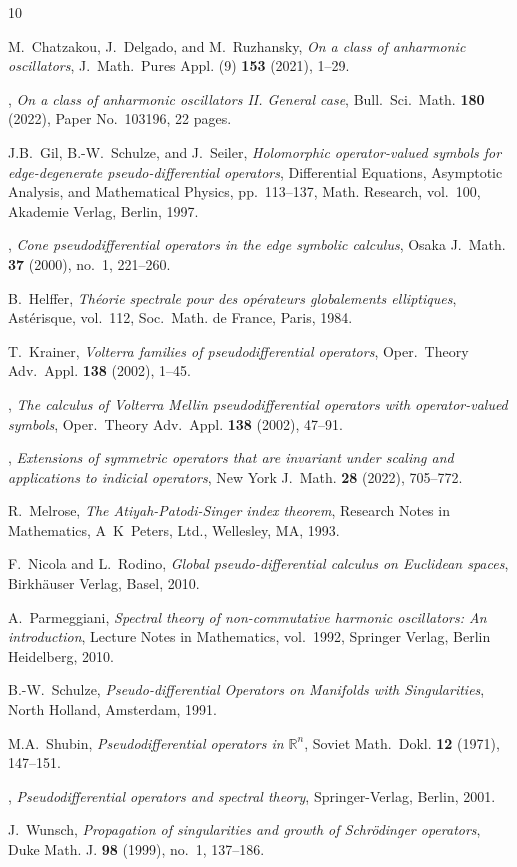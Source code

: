 \documentclass[reqno]{amsart}
\numberwithin{equation}{section}
\theoremstyle{definition}
\begin{document}
\begin{thebibliography}{10}

M.~Chatzakou, J.~Delgado, and M.~Ruzhansky, \emph{On a class of anharmonic oscillators}, J.~Math.~Pures Appl. (9) \textbf{153} (2021), 1--29.

\bysame, \emph{On a class of anharmonic oscillators II. General case}, Bull.~Sci.~Math. \textbf{180} (2022), Paper No.~103196, 22 pages.

J.B.~Gil, B.-W.~Schulze, and J.~Seiler, \emph{Holomorphic operator-valued symbols for edge-degenerate pseudo-differential operators}, Differential Equations, Asymptotic Analysis, and Mathematical Physics, pp.~113--137, Math. Research, vol.~100, Akademie Verlag, Berlin, 1997.

\bysame, \emph{Cone pseudodifferential operators in the edge symbolic calculus}, Osaka J.~Math. \textbf{37} (2000), no.~1, 221--260.

B.~Helffer, \emph{Th{\'e}orie spectrale pour des op{\'e}rateurs globalements elliptiques}, Ast{\'e}risque, vol.~112, Soc.~Math. de France, Paris, 1984.

T.~Krainer, \emph{Volterra families of pseudodifferential operators}, Oper.~Theory Adv.~Appl. \textbf{138} (2002), 1--45.

\bysame, \emph{The calculus of Volterra Mellin pseudodifferential operators with operator-valued symbols}, Oper.~Theory Adv.~Appl. \textbf{138} (2002), 47--91.

\bysame, \emph{Extensions of symmetric operators that are invariant under scaling and applications to indicial operators}, New York J.~Math. \textbf{28} (2022), 705--772.

R.~Melrose, \emph{The Atiyah-Patodi-Singer index theorem}, Research Notes in Mathematics, A~K~Peters, Ltd., Wellesley, MA, 1993.

F.~Nicola and L.~Rodino, \emph{Global pseudo-differential calculus on Euclidean spaces}, Birkh{\"a}user Verlag, Basel, 2010.

A.~Parmeggiani, \emph{Spectral theory of non-commutative harmonic oscillators: An introduction}, Lecture Notes in Mathematics, vol.~1992, Springer Verlag, Berlin Heidelberg, 2010.

B.-W.~Schulze, \emph{Pseudo-differential Operators on Manifolds with Singularities}, North Holland, Amsterdam, 1991.

M.A.~Shubin, \emph{Pseudodifferential operators in ${\mathbb R}^n$}, Soviet Math.~Dokl. \textbf{12} (1971), 147--151.

\bysame, \emph{Pseudodifferential operators and spectral theory}, Springer-Verlag, Berlin, 2001.

J.~Wunsch, \emph{Propagation of singularities and growth of Schr{\"o}dinger operators}, Duke Math. J. \textbf{98} (1999), no.~1, 137--186.

\end{thebibliography}
\end{document}
